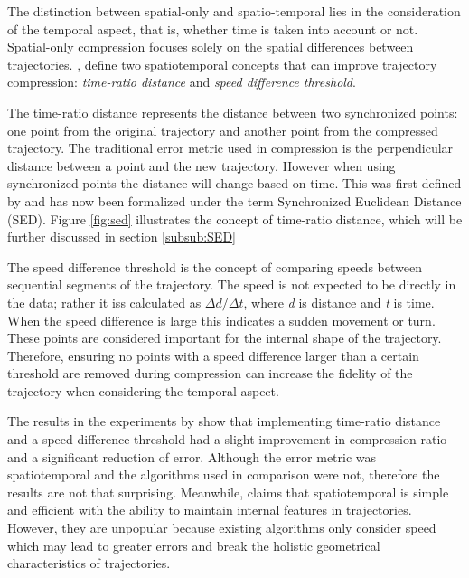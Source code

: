 The distinction between spatial-only and spatio-temporal lies in the consideration of the temporal aspect, that is, whether time is taken into account or not. Spatial-only compression focuses solely on the spatial differences between trajectories. \cite{SpatiotemporalComp}, define two spatiotemporal concepts that can improve trajectory compression: \textit{time-ratio distance} and \textit{speed difference threshold}.

The time-ratio distance represents the distance between two synchronized points: one point from the original trajectory and another point from the compressed trajectory. The traditional error metric used in compression is the perpendicular distance between a point and the new trajectory. However when using synchronized points the distance will change based on time. This was first defined by \cite{SpatiotemporalComp} and has now been formalized under the term Synchronized Euclidean Distance (SED). Figure \ref{fig:sed} illustrates the concept of time-ratio distance, which will be further discussed in section \ref{subsub:SED}

The speed difference threshold is the concept of comparing speeds between sequential segments of the trajectory. The speed is not expected to be directly in the data; rather it iss calculated as $ \Delta d / \Delta t $, where \textit{d} is distance and \textit{t} is time. When the speed difference is large this indicates a sudden movement or turn. These points are considered important for the internal shape of the trajectory. Therefore, ensuring no points with a speed difference larger than a certain threshold are removed during compression can increase the fidelity of the trajectory when considering the temporal aspect.

The results in the experiments by \cite{SpatiotemporalComp} show that implementing time-ratio distance and a speed difference threshold had a slight improvement in compression ratio and a significant reduction of error. Although the error metric was spatiotemporal and the algorithms used in comparison were not, therefore the results are not that surprising. Meanwhile, \cite{Sun2016} claims that spatiotemporal is simple and efficient with the ability to maintain internal features in trajectories. However, they are unpopular because existing algorithms only consider speed which may lead to greater errors and break the holistic geometrical characteristics of trajectories.


